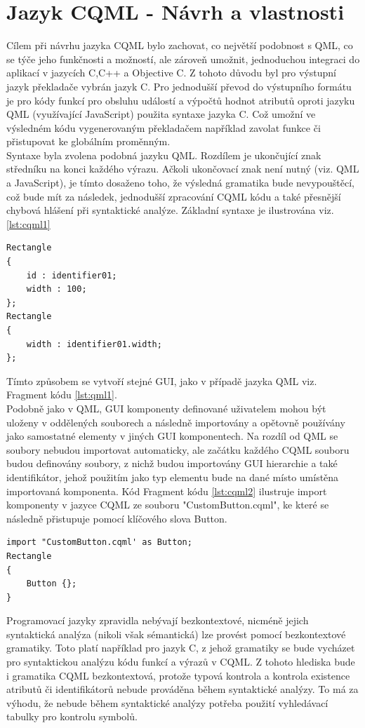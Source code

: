 \documentclass[report,11pt]{elsarticle}
\begin{document}
\section{\label{SEC:CQML}Jazyk CQML - Návrh a vlastnosti}
Cílem při návrhu jazyka CQML bylo zachovat, co největší podobnost s QML, co se týče jeho funkčnosti a možností, ale zároveň umožnit, jednoduchou integraci do aplikací v jazycích C,C++ a Objective C. Z tohoto důvodu byl pro výstupní jazyk překladače vybrán jazyk C. Pro jednodušší převod do výstupního formátu je pro kódy funkcí pro obsluhu událostí a výpočtů hodnot atributů oproti jazyku QML (využívající JavaScript) použita syntaxe jazyka C. Což umožní ve výsledném kódu vygenerovaným překladačem  například zavolat funkce či přistupovat ke globálním proměnným.\\
Syntaxe byla zvolena podobná jazyku QML. Rozdílem je ukončující znak středníku na konci každého výrazu. Ačkoli ukončovací znak není nutný (viz. QML a JavaScript), je tímto dosaženo toho, že výsledná gramatika bude nevypouštěcí, což bude mít za následek, jednodušší zpracování CQML kódu a také přesnější chybová hlášení při syntaktické analýze. Základní syntaxe je ilustrována viz. \ref{lst:cqml1}
\begin{lstlisting}[frame=single,caption=Tvorba dvou jednoduchých elementů pomocí jazyka CQML.,label=lst:cqml1]
Rectangle
{
	id : identifier01;
	width : 100;
};
Rectangle
{
	width : identifier01.width;
};
\end{lstlisting}
Tímto způsobem se vytvoří stejné GUI, jako v případě jazyka QML viz. Fragment kódu \ref{lst:qml1}.\\
Podobně jako v QML, GUI komponenty definované uživatelem mohou být uloženy v oddělených souborech a následně importovány a opětovně používány jako samostatné elementy v jiných GUI komponentech. Na rozdíl od QML se soubory nebudou importovat automaticky, ale začátku každého CQML souboru budou definovány soubory, z nichž budou importovány GUI hierarchie a také identifikátor, jehož použitím jako typ elementu bude na dané místo umístěna importovaná komponenta. Kód Fragment kódu \ref{lst:cqml2} ilustruje import komponenty v jazyce CQML ze souboru "CustomButton.cqml", ke které se následně přistupuje pomocí klíčového slova Button.
\begin{lstlisting}[frame=single,caption=Ukázka importu komponenty v jazyce CQML.,label=lst:cqml2]
import "CustomButton.cqml' as Button;
Rectangle
{
	Button {};
}
\end{lstlisting}
Programovací jazyky zpravidla nebývají bezkontextové, nicméně jejich syntaktická analýza (nikoli však sémantická) lze provést pomocí bezkontextové gramatiky. Toto platí například pro jazyk C, z jehož gramatiky se bude vycházet pro syntaktickou analýzu kódu funkcí a výrazů v CQML. Z tohoto hlediska bude i gramatika CQML bezkontextová, protože typová kontrola a kontrola existence atributů či identifikátorů nebude prováděna během syntaktické analýzy. To má za výhodu, že nebude během syntaktické analýzy potřeba použití vyhledávací tabulky pro kontrolu symbolů.\\
\end{document}
